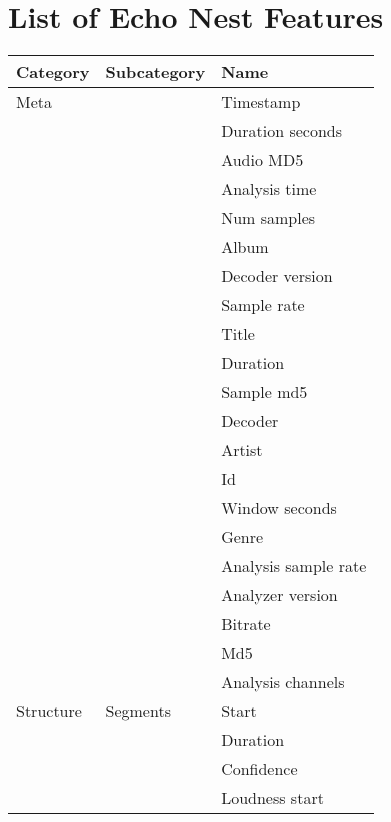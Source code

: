 \chapter{List of Echo Nest Features} 

\label{AppendixB} 


\begin{center}
\begin{longtable}{ p{} p{} p{} } 

\textbf{Category} & \textbf{Subcategory} & \textbf{Name} \\ \toprule
Meta & & Timestamp  \\ \cmidrule(r){3-3}
& & Duration seconds \\ \cmidrule(r){3-3}
& & Audio MD5 \\ \cmidrule(r){3-3}
& & Analysis time \\ \cmidrule(r){3-3}
& & Num samples \\ \cmidrule(r){3-3}
& & Album \\ \cmidrule(r){3-3}
& & Decoder version \\ \cmidrule(r){3-3}
& & Sample rate \\ \cmidrule(r){3-3}
& & Title \\ \cmidrule(r){3-3}
& & Duration \\ \cmidrule(r){3-3}
& & Sample md5 \\ \cmidrule(r){3-3}
& & Decoder \\ \cmidrule(r){3-3}
& & Artist \\ \cmidrule(r){3-3}
& & Id \\ \cmidrule(r){3-3}
& & Window seconds \\ \cmidrule(r){3-3}
& & Genre \\ \cmidrule(r){3-3}
& & Analysis sample rate \\ \cmidrule(r){3-3}
& & Analyzer version \\ \cmidrule(r){3-3}
& & Bitrate \\ \cmidrule(r){3-3}
& & Md5 \\ \cmidrule(r){3-3}
& & Analysis channels \\ \hline
Structure & Segments & Start \\ \cmidrule(r){3-3}
& & Duration \\ \cmidrule(r){3-3}
& & Confidence \\ \cmidrule(r){3-3}
& & Loudness start \\ \cmidrule(r){3-3}

\end{longtable}
\end{center}
